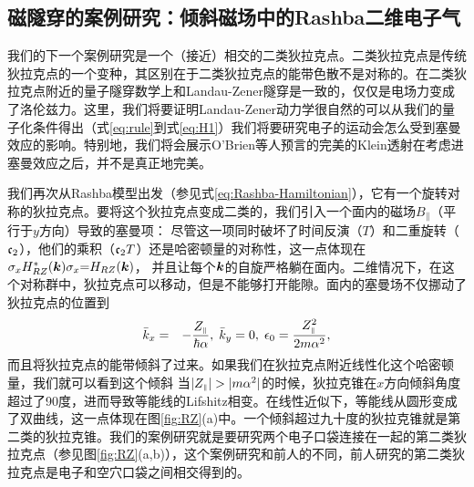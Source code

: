 \subsection{磁隧穿的案例研究：倾斜磁场中的Rashba二维电子气}\label{sec:inplanezeeman}

我们的下一个案例研究是一个（接近）相交的二类狄拉克点\cite{soluyanov_type-ii_2015,muechler_tilted_2016}。二类狄拉克点是传统狄拉克点的一个变种，其区别在于二类狄拉克点的能带色散不是对称的。在二类狄拉克点附近的量子隧穿数学上和Landau-Zener隧穿是一致的，仅仅是电场力变成了洛伦兹力\cite{AALG,obrien_magnetic_2016,kane_blount}。这里，我们将要证明Landau-Zener动力学很自然的可以从我们的量子化条件得出（式\ref{eq:rule}到式\ref{eq:H1}）我们将要研究电子的运动会怎么受到塞曼效应的影响。特别地，我们将会展示O'Brien等人预言的\cite{obrien_magnetic_2016}完美的Klein透射在考虑进塞曼效应之后，并不是真正地完美。

我们再次从Rashba模型出发（参见式\ref{eq:Rashba-Hamiltonian}），它有一个旋转对称的狄拉克点。要将这个狄拉克点变成二类的，我们引入一个面内的磁场$B_\parallel$（平行于$y$方向）导致的塞曼项：
尽管这一项同时破坏了时间反演（$T$）和二重旋转（$\mathfrak{c}_2$），他们的乘积（$\mathfrak{c}_2 T$）还是哈密顿量的对称性，这一点体现在 $\sigma_x H^*_{RZ}(\boldsymbol{k})\sigma_x{=}H_{RZ}(\boldsymbol{k})$， 并且让每个$\boldsymbol{k}$的自旋严格躺在面内。二维情况下，在这个对称群中，狄拉克点可以移动，但是不能够打开能隙。面内的塞曼场不仅挪动了狄拉克点的位置到
\begin{eqnarray}
\bar{k}_x & = & -\frac{Z_{\scriptscriptstyle{\parallel}}}{\hbar\alpha},\;\bar{k}_y=0,\;\epsilon_{0}=\frac{Z_{\scriptscriptstyle{\parallel}}^{2}}{2m\alpha^2},\label{whereisdiracpoint}
\end{eqnarray}
而且将狄拉克点的能带倾斜了过来。如果我们在狄拉克点附近线性化这个哈密顿量，我们就可以看到这个倾斜
当$|\zpar|>|m\alpha^2|$的时候，狄拉克锥在$x$方向倾斜角度超过了90度，进而导致等能线的Lifshitz相变。在线性近似下，等能线从圆形变成了双曲线，这一点体现在图\ref{fig:RZ}(a)中。一个倾斜超过九十度的狄拉克锥就是第二类的狄拉克锥。我们的案例研究就是要研究两个电子口袋连接在一起的第二类狄拉克点（参见图\ref{fig:RZ}(a,b)），这个案例研究和前人的不同\cite{obrien_magnetic_2016,AALG}，前人研究的第二类狄拉克点是电子和空穴口袋之间相交得到的。

